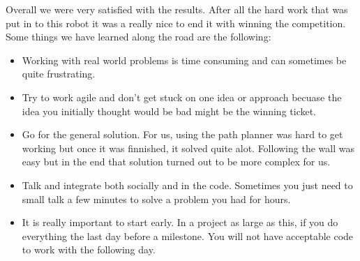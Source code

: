 Overall we were very satisfied with the results. After all the hard work that was put in to this robot it was a really nice to end it with winning the competition. 
Some things we have learned along the road are the following:
\begin{itemize}
\item Working with real world problems is time consuming and can sometimes be quite frustrating.
\item Try to work agile and don't get stuck on one idea or approach becuase the idea you initially thought would be bad might be the winning ticket.
\item Go for the general solution. For us, using the path planner was hard to get working but once it was finnished, it solved quite alot. Following the wall was easy but in the end that solution turned out to be more complex for us.
\item Talk and integrate both socially and in the code. Sometimes you just need to small talk a few minutes to solve a problem you had for hours.
\item It is really important to start early. In a project as large as this, if you do everything the last day before a milestone. You will not have acceptable code to work with the following day.
\end{itemize}